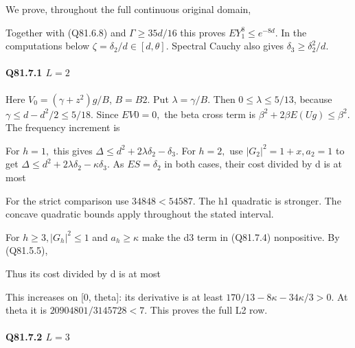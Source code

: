 
We prove, throughout the full continuous original domain,


Together with (Q81.6.8) and \(\Gamma\ge 35d/16\) this proves
\(EY_1^8\le e^{-8d}\).
In the computations below \(\zeta=\delta_2/d\in[d,\allowbreak  \theta]\).
Spectral Cauchy also gives \(\delta_3\ge \delta_2^2/d\).

\paragraph{Q81.7.1 \(L=2\)}

Here \(V_0=(\gamma+z^2)g/B\), \(B=B2.\) Put \(\lambda=\gamma/B.\)
Then \(0\le\lambda\le5/13\), because
\(\gamma\le d-d^2/2\le5/18\). Since \(EV0=0,\allowbreak \) the beta cross term is
\(\beta^2+2\beta E(Ug)\le\beta^2\). The frequency increment is


For \(h=1,\allowbreak \) this gives \(\Delta\le d^2+2\lambda \delta_2-\delta_3\).
For \(h=2,\allowbreak \) use \(|G_2|^2=1+x,\allowbreak  a_2=1\) to get
\(\Delta\le d^2+2\lambda \delta_2-\kappa \delta_3\).
As \(ES=\delta_2\) in both cases, their cost divided by d is at most


For the strict comparison use \(34848<54587.\) The h1 quadratic is
stronger. The concave quadratic bounds apply throughout the stated interval.

For \(h\ge 3,\allowbreak  |G_h|^2\le1\) and \(a_h\ge\kappa\) make the d3 term
in (Q81.7.4) nonpositive. By (Q81.5.5),


Thus its cost divided by d is at most


This increases on [0, theta]: its derivative is at least
\(170/13-8\kappa-34\kappa/3>0\).
At theta it is \(20904801/3145728<7\). This proves the full L2 row.

\paragraph{Q81.7.2 \(L=3\)}

